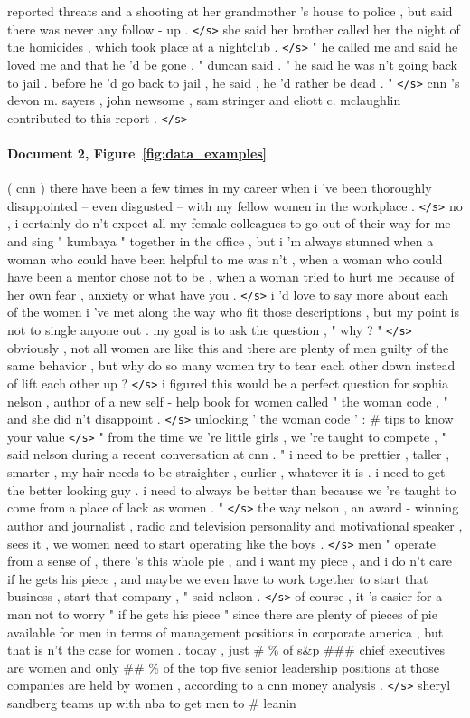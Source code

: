 \documentclass[12pt]{report}
\begin{document}
\begin{appendices}
reported threats and a shooting at her grandmother 's house to police , but said there was never any follow - up . \texttt{</s>} she said her brother called her the night of the homicides , which took place at a nightclub . \texttt{</s>} " he called me and said he loved me and that he 'd be gone , " duncan said . " he said he was n't going back to jail . before he 'd go back to jail , he said , he 'd rather be dead . " \texttt{</s>} cnn 's devon m. sayers , john newsome , sam stringer and eliott c. mclaughlin contributed to this report . \texttt{</s>}

\paragraph{Document 2, Figure~\ref{fig:data_examples}}  ( cnn ) there have been a few times in my career when i 've been thoroughly disappointed -- even disgusted -- with my fellow women in the workplace . \texttt{</s>} no , i certainly do n't expect all my female colleagues to go out of their way for me and sing " kumbaya " together in the office , but i 'm always stunned when a woman who could have been helpful to me was n't , when a woman who could have been a mentor chose not to be , when a woman tried to hurt me because of her own fear , anxiety or what have you . \texttt{</s>} i 'd love to say more about each of the women i 've met along the way who fit those descriptions , but my point is not to single anyone out . my goal is to ask the question , " why ? " \texttt{</s>} obviously , not all women are like this and there are plenty of men guilty of the same behavior , but why do so many women try to tear each other down instead of lift each other up ? \texttt{</s>} i figured this would be a perfect question for sophia nelson , author of a new self - help book for women called " the woman code , " and she did n't disappoint . \texttt{</s>} unlocking ' the woman code ' : \# tips to know your value \texttt{</s>} " from the time we 're little girls , we 're taught to compete , " said nelson during a recent conversation at cnn . " i need to be prettier , taller , smarter , my hair needs to be straighter , curlier , whatever it is . i need to get the better looking guy . i need to always be better than because we 're taught to come from a place of lack as women . " \texttt{</s>} the way nelson , an award - winning author and journalist , radio and television personality and motivational speaker , sees it , we women need to start operating like the boys . \texttt{</s>} men " operate from a sense of , there 's this whole pie , and i want my piece , and i do n't care if he gets his piece , and maybe we even have to work together to start that business , start that company , " said nelson . \texttt{</s>} of course , it 's easier for a man not to worry " if he gets his piece " since there are plenty of pieces of pie available for men in terms of management positions in corporate america , but that is n't the case for women . today , just \# \% of s\&p \#\#\# chief executives are women and only \#\# \% of the top five senior leadership positions at those companies are held by women , according to a cnn money analysis . \texttt{</s>} sheryl sandberg teams up with nba to get men to \# leanin 
\end{appendices}
\end{document}
